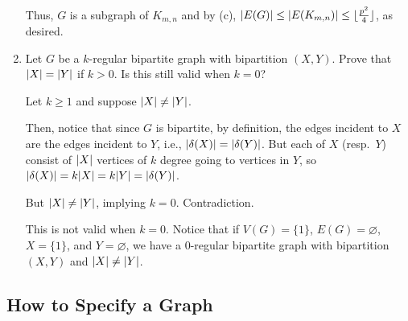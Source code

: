 \documentclass[class=math239,notes,tikz]{agony}
\begin{document}
\begin{enumerate}
\begin{sol}
          Thus, $G$ is a subgraph of $K_{m,n}$
          and by (c), $\abs{E(G)} \leq \abs{E(K_{m,n})} \leq \lfloor\frac{p^2}{4}\rfloor$, as desired.
        \end{sol}
  \item Let $G$ be a $k$-regular bipartite graph with bipartition $(X,Y)$.
        Prove that $\abs{X} = \abs{Y}$ if $k > 0$.
        Is this still valid when $k=0$?
        \begin{prf}
          Let $k \geq 1$ and suppose $\abs{X} \neq \abs{Y}$.

          Then, notice that since $G$ is bipartite, by definition,
          the edges incident to $X$ are the edges incident to $Y$,
          i.e., $\abs{\delta(X)} = \abs{\delta(Y)}$.
          But each of $X$ (resp.\ $Y$) consist of $\abs{X}$
          vertices of $k$ degree going to vertices in $Y$,
          so $\abs{\delta(X)} = k\abs{X} = k\abs{Y} = \abs{\delta(Y)}$.

          But $\abs{X} \neq \abs{Y}$, implying $k = 0$. Contradiction.

          This is not valid when $k=0$.
          Notice that if $V(G) = \{1\}$, $E(G) = \varnothing$,
          $X = \{1\}$, and $Y = \varnothing$,
          we have a 0-regular bipartite graph with bipartition $(X,Y)$
          and $\abs{X} \neq \abs{Y}$.
        \end{prf}
\end{enumerate}

\subsection{How to Specify a Graph}
\end{document}
